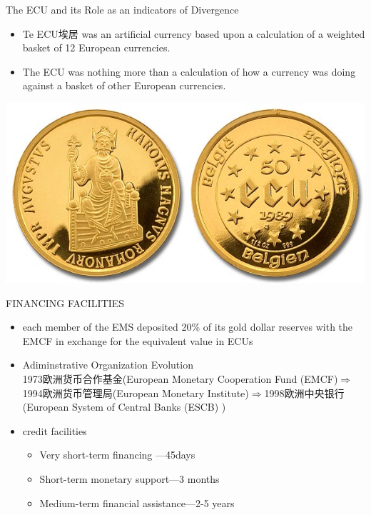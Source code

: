 \documentclass[10pt,hyperref={CJKbookmarks=true},xcolor=dvipsnames,aspectratio=169]{beamer}
\begin{document}
\begin{frame}{The ECU and its Role as an indicators of Divergence}
\begin{itemize}
	\item 	Te ECU埃居 was an artificial currency based upon a calculation of a weighted basket
	of 12 European currencies.
	\item The ECU was nothing more than a calculation of how a currency was doing against
	a basket of other European currencies. 
\end{itemize}
		\centering
\includegraphics[scale=0.3]{fig/euro/ecu}
\end{frame}

\begin{frame}{FINANCING FACILITIES }
	\begin{itemize}
		\item  each member of the EMS deposited 20\%
		of its gold dollar reserves with the EMCF in exchange for the equivalent value in
		ECUs
		\item Adiminstrative Organization Evolution\\
		1973欧洲货币合作基金(European
		Monetary Cooperation Fund (EMCF)$\Rightarrow$1994欧洲货币管理局(European
		Monetary Institute)$\Rightarrow$1998欧洲中央银行(European System of Central Banks
		(ESCB) )
		\item credit
		facilities
		\begin{itemize}
			\item Very short-term financing ---45days
			\item Short-term monetary support---3 months
			\item Medium-term financial assistance---2-5 years
		\end{itemize}
\end{itemize}
\end{frame}
\end{document}
